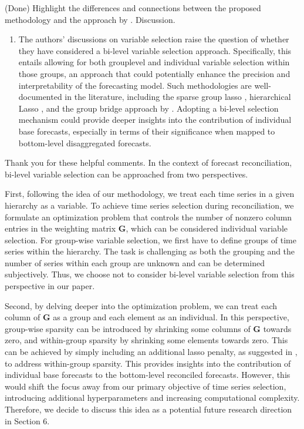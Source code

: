 \documentclass[11pt,a4paper,]{article}
\providecommand{\tightlist}{%
  \setlength{\itemsep}{0pt}\setlength{\parskip}{0pt}}
\renewenvironment{quote}
               {\list{}{\rightmargin\leftmargin}%
                \item\relax\color[RGB]{0,150,0}}
               {\endlist}
\begin{document}
\begin{quote}
(Done) Highlight the differences and connections between the proposed
methodology and the approach by \textcite{Zhang2023-op}. Discussion.
\end{quote}

\begin{enumerate}
\def\labelenumi{\arabic{enumi}.}
\setcounter{enumi}{1}
\tightlist
\item
  The authors' discussions on variable selection raise the question of
  whether they have considered a bi-level variable selection approach.
  Specifically, this entails allowing for both grouplevel and individual
  variable selection within those groups, an approach that could
  potentially enhance the precision and interpretability of the
  forecasting model. Such methodologies are well-documented in the
  literature, including the sparse group lasso \autocite{Simon2013-sp},
  hierarchical Lasso \autocite{Zhou2010-vs}, and the group bridge
  approach by \textcite{Huang2009-vs}. Adopting a bi-level selection
  mechanism could provide deeper insights into the contribution of
  individual base forecasts, especially in terms of their significance
  when mapped to bottom-level disaggregated forecasts.
\end{enumerate}

\begin{quote}
Thank you for these helpful comments. In the context of forecast
reconciliation, bi-level variable selection can be approached from two
perspectives.

First, following the idea of our methodology, we treat each time series
in a given hierarchy as a variable. To achieve time series selection
during reconciliation, we formulate an optimization problem that
controls the number of nonzero column entries in the weighting matrix
\(\bm{G}\), which can be considered individual variable selection. For
group-wise variable selection, we first have to define groups of time
series within the hierarchy. The task is challenging as both the
grouping and the number of series within each group are unknown and can
be determined subjectively. Thus, we choose not to consider bi-level
variable selection from this perspective in our paper.

Second, by delving deeper into the optimization problem, we can treat
each column of \(\bm{G}\) as a group and each element as an individual.
In this perspective, group-wise sparsity can be introduced by shrinking
some columns of \(\bm{G}\) towards zero, and within-group sparsity by
shrinking some elements towards zero. This can be achieved by simply
including an additional lasso penalty, as suggested in
\textcite{Simon2013-sp}, to address within-group sparsity. This provides
insights into the contribution of individual base forecasts to the
bottom-level reconciled forecasts. However, this would shift the focus
away from our primary objective of time series selection, introducing
additional hyperparameters and increasing computational complexity.
Therefore, we decide to discuss this idea as a potential future research
direction in Section 6.
\end{quote}
\end{document}
